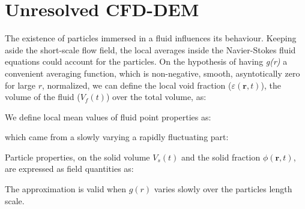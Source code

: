 
\chapter{Unresolved CFD-DEM}
\label{cap:unresolvedcfddem}

The existence of particles immersed in a fluid influences its behaviour. 
Keeping aside the short-scale flow field, the local averages inside the
Navier-Stokes fluid equations could account for the particles.
On the hypothesis of having \textit{g(r)} a convenient averaging function, which
is non-negative, smooth, asyntotically zero for large $r$, normalized, we can
define the local void fraction ($\varepsilon(\mathbf{r},t)$), the volume of the
fluid ($V_f(t)$) over the total volume, as:

We define local mean values of fluid point properties as:

which came from a slowly varying a rapidly fluctuating part:

Particle properties, on the solid volume $V_s(t)$ and the solid fraction
$\phi(\mathbf{r},t)$, are expressed as field quantities as:

The approximation is valid when $g(r)$ varies slowly over the particles length
scale.



